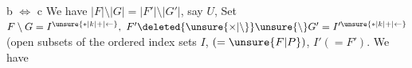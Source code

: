 b $\Longleftrightarrow$ c  We have $|F|\setminus|G|=|F'|\setminus|G'|$, say $U$, Set $F\setminus G=I^{\unsure{\ast|k|+|\leftarrow}},\ F'\deleted{\unsure{\times|\setminus}}\unsure{\setminus}G'=I'^{\unsure{\ast|k|+|\leftarrow}}$ (open subsets of the ordered index sets $I$,  $(=\unsure{F|P})$, $I'(=F')$. We have
